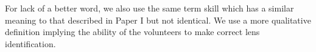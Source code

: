 \documentclass[useAMS,usenatbib,a4paper]{mn2e}
\begin{document}
For lack of a better word, we also use the same term skill which has a
similar meaning to that described in Paper I but not identical. We use a
more qualitative definition implying the ability of the volunteers to
make correct lens identification.






% 



%



\label{lastpage}
\bsp
\end{document}
